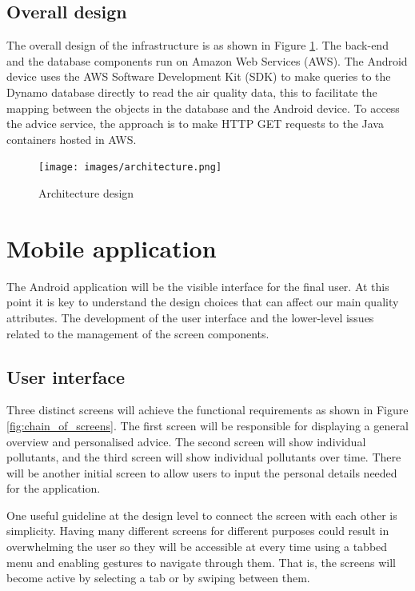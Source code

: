 \subsection{Overall design}
The overall design of the infrastructure is as shown in Figure \ref{fig:architecture}. The back-end and the database components run on Amazon Web Services (AWS). The Android device uses the AWS Software Development Kit (SDK) to make queries to the Dynamo database directly to read the air quality data, this to facilitate the mapping between the objects in the database and the Android device. To access the advice service, the approach is to make HTTP GET requests to the Java containers hosted in AWS. 
\begin{figure}[H]
\begin{adjustbox}{width=.65\textwidth,center=\textwidth}
  \centering
  \texttt{[image: images/architecture.png]}
\end{adjustbox}
  \caption[Architecture design]{Architecture design}
  \label{fig:architecture}
\end{figure}

\section{Mobile application}
The Android application will be the visible interface for the final user. At this point it is key to understand the design choices that can affect our main quality attributes. The development of the user interface and the lower-level issues related to the management of the screen components. 

\subsection{User interface}
Three distinct screens will achieve the functional requirements as shown in Figure \ref{fig:chain_of_screens}. The first screen will be responsible for displaying a general overview and personalised advice. The second screen will show individual pollutants, and the third screen will show individual pollutants over time. There will be another initial screen to allow users to input the personal details needed for the application.

One useful guideline at the design level to connect the screen with each other is simplicity. Having many different screens for different purposes could result in overwhelming the user so they will be accessible at every time using a tabbed menu and enabling gestures to navigate through them. That is, the screens will become active by selecting a tab or by swiping between them.

